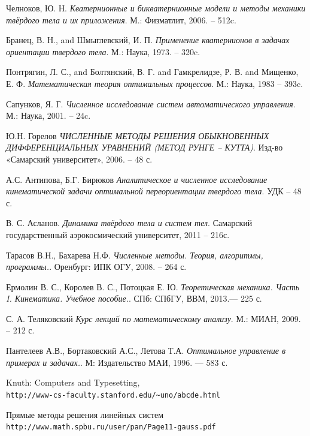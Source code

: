 \documentclass[14pt]{extreport}
\begin{document}
\begin{thebibliography}{9}
Челноков, Ю. Н.
\textit{Кватернионные и бикватернионные модели и методы механики твёрдого тела и их приложения}. 
М.: Физматлит, 2006. – 512c.
 
Бранец, В. Н., and Шмыглевский, И. П.
\textit{Применение кватернионов в задачах ориентации твердого тела}. 
М.: Наука, 1973. – 320c.

Понтрягин, Л. С., and Болтянский, В. Г. and Гамкрелидзе, Р. В. and  Мищенко, Е. Ф.
\textit{Математическая теория оптимальных процессов}. 
М.: Наука, 1983 – 393c.

Сапунков, Я. Г.
\textit{Численное исследование систем автоматического управления}. 
М.: Наука, 2001. – 24c.	
	
Ю.Н. Горелов
\textit{ЧИСЛЕННЫЕ МЕТОДЫ РЕШЕНИЯ ОБЫКНОВЕННЫХ ДИФФЕРЕНЦИАЛЬНЫХ УРАВНЕНИЙ (МЕТОД РУНГЕ – КУТТА)}. 
Изд-во «Самарский университет», 2006. – 48 с.		

А.С. Антипова, Б.Г. Бирюков
\textit{Аналитическое и численное исследование  кинематической задачи оптимальной переориентации твердого тела}. 
УДК – 48 с.	

В. С. Асланов.
\textit{Динамика твёрдого тела и систем тел}. 
Самарский государственный аэрокосмический университет, 2011  – 216с.

Тарасов В.Н., Бахарева Н.Ф. 
\textit{Численные методы. Теория, алгоритмы, программы.}. 
Оренбург: ИПК ОГУ, 2008. – 264 с. 

Ермолин В. С., Королев В. С., Потоцкая Е. Ю.
\textit{Теоретическая механика. Часть I. Кинематика. Учебное пособие.}. 
СПб: СПбГУ, ВВМ, 2013.— 225 с. 

С. А. Теляковский
\textit{Курс лекций по математическому анализу}. 
М.: МИАН, 2009. – 212 с.

Пантелеев А.В., Бортаковский А.С., Летова Т.А.
\textit{Оптимальное управление в примерах и задачах.}. 
М: Издательство МАИ, 1996. — 583 с. 

Knuth: Computers and Typesetting,
\\\texttt{\small{http://www-cs-faculty.stanford.edu/\~{}uno/abcde.html}}

Прямые методы решения линейных систем
\\\texttt{\small{http://www.math.spbu.ru/user/pan/Page11-gauss.pdf}}


\end{thebibliography}
\end{document}
